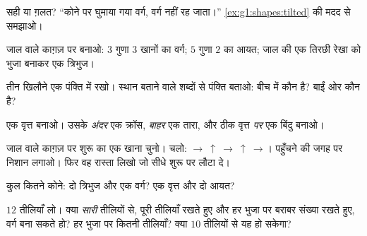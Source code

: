 \begin{exercise}[$\star$]\label{exo:g1:shapes:3}
सही या ग़लत? ``कोने पर घुमाया गया वर्ग, वर्ग नहीं रह
जाता।'' \cref{ex:g1:shapes:tilted} की मदद से समझाओ।
\end{exercise}

\begin{exercise}[$\star$]\label{exo:g1:shapes:4}
जाल वाले काग़ज़ पर बनाओ: $3$ गुणा $3$ खानों का वर्ग; $5$ गुणा
$2$ का आयत; जाल की एक तिरछी रेखा को भुजा बनाकर एक त्रिभुज।
\end{exercise}

\begin{exercise}[$\star$]\label{exo:g1:shapes:5}
तीन खिलौने एक पंक्ति में रखो। स्थान बताने वाले शब्दों से पंक्ति
बताओ: बीच में कौन है? बाईं ओर कौन है?
\end{exercise}

\begin{exercise}[$\star$]\label{exo:g1:shapes:6}
एक वृत्त बनाओ। उसके \emph{अंदर} एक क्रॉस, \emph{बाहर} एक तारा,
और ठीक वृत्त \emph{पर} एक बिंदु बनाओ।
\end{exercise}

\begin{exercise}[$\star$]\label{exo:g1:shapes:7}
जाल वाले काग़ज़ पर शुरू का एक खाना चुनो। चलो:
$\to\ \uparrow\ \to\ \uparrow\ \to$। पहुँचने की जगह पर निशान लगाओ। फिर
वह रास्ता लिखो जो सीधे शुरू पर लौटा दे।
\end{exercise}

\begin{exercise}[$\star$]\label{exo:g1:shapes:8}
कुल कितने कोने: दो त्रिभुज और एक वर्ग? एक वृत्त और दो
आयत?
\end{exercise}

\begin{exercise}[$\star\star$]\label{exo:g1:shapes:9}
$12$ तीलियाँ लो। क्या \emph{सारी} तीलियों से, पूरी तीलियाँ रखते
हुए और हर भुजा पर बराबर संख्या रखते हुए, वर्ग बना सकते हो? हर
भुजा पर कितनी तीलियाँ? क्या $10$ तीलियों से यह हो सकेगा?
\end{exercise}
